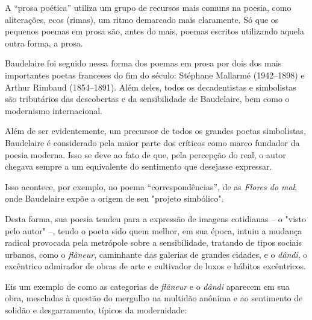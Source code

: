 \documentclass[12pt]{extarticle}
\begin{document}
A “prosa poética” utiliza um grupo de recursos mais comuns na poesia, como
aliterações, ecos (rimas), um ritmo demarcado mais claramente.
Só que os pequenos poemas em prosa são, antes do mais, poemas escritos
utilizando aquela outra forma, a prosa.
 
Baudelaire foi seguido nessa forma dos poemas em prosa por dois dos mais
importantes poetas franceses do fim do século: Stéphane Mallarmé (1942--1898) 
e Arthur Rimbaud (1854--1891).
Além deles, todos os decadentistas e simbolistas são tributários das
descobertas e da sensibilidade de Baudelaire, bem como o modernismo
internacional.

Além de ser evidentemente, um precursor de todos os grandes poetas simbolistas,
Baudelaire é considerado pela maior parte dos críticos como marco fundador da
poesia moderna. Isso se deve ao fato de que, pela percepção do real, o autor chegava
sempre a um equivalente do sentimento que desejasse expressar. 

Isso acontece, por exemplo, no poema “correspondências”, de as \textit{Flores do mal},
onde Baudelaire expõe a origem de seu "projeto simbólico". 
 
Desta forma, sua poesia tendeu para a expressão de imagens cotidianas -- o "visto
pelo autor" --, tendo o poeta sido quem melhor, em sua época, intuiu a mudança
radical provocada pela metrópole sobre a sensibilidade, tratando de tipos
sociais urbanos, como o \textit{flâneur}, caminhante das galerias de grandes cidades,
e o \textit{dândi}, o excêntrico admirador de obras de arte e cultivador de luxos e
hábitos excêntricos.

Eis um exemplo de como as categorias de \textit{flâneur} e o \textit{dândi} aparecem em sua obra, 
mescladas à questão do mergulho na multidão anônima e ao sentimento de solidão 
e desgarramento, típicos da modernidade:
 
\end{document}
